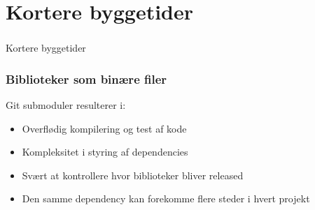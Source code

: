 \section[Kortere byggetider]{Kortere byggetider}

\begin{frame}
  \frametitle{}
  \begin{center}
    {\Huge Kortere byggetider}
  \end{center}
\end{frame}

\begin{frame}
    \frametitle{Biblioteker som binære filer}
	Git submoduler resulterer i:
    \begin{itemize}
        \item Overflødig kompilering og test af kode
        \item Kompleksitet i styring af dependencies
        \item Svært at kontrollere hvor biblioteker bliver released
        \item Den samme dependency kan forekomme flere steder i hvert projekt
    \end{itemize}
\end{frame}

